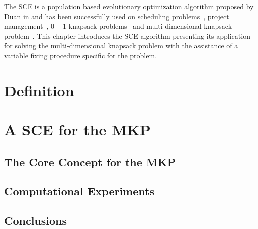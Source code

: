 The SCE is a population
based evolutionary optimization algorithm 
proposed by Duan in \cite{duan1992effective}
and has been successfully used on scheduling problems~\cite{zhao2015shuffled},
project management~\cite{elbeltagi2007modified},
$0-1$ knapsack problems~\cite{bhattacharjee2014shuffled} and
multi-dimensional knapsack problem~\cite{baroni2015shuffled,baroni2016shuffled}.
This chapter introduces the SCE algorithm presenting its
application for solving the multi-dimensional knapsack problem
with the assistance of a variable fixing procedure specific for the problem.

\section{Definition}
\label{sec:sce}


\section{A SCE for the MKP}
\label{sec:scemkp}


\subsection{The Core Concept for the MKP}
\label{sec:core}


\subsection{Computational Experiments}
\label{sec:scemkpcomp}


\subsection{Conclusions}
\label{sec:scemkpconc}

